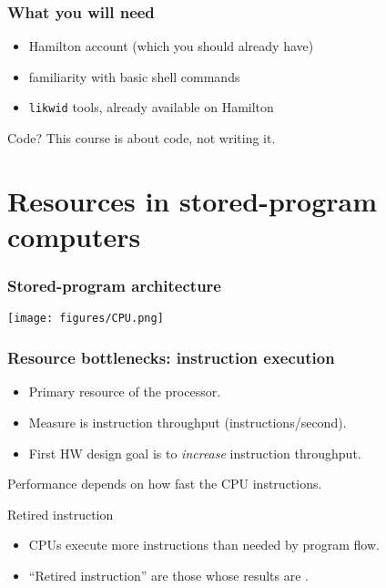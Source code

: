 \documentclass[dvipsnames,presentation,aspectratio=169,14pt]{beamer}
\begin{document}
\begin{frame}
  \frametitle{What you will need}
  \begin{itemize}[itemsep=5pt]
  \item Hamilton account (which you should already have)
  \item familiarity with basic shell commands
  \item \texttt{likwid} tools, already available on Hamilton
  \end{itemize}
  \vskip 15pt
  \begin{challenge}{Code?}
    This course is about  code, not writing it.
  \end{challenge}
\end{frame}

\section{Resources in stored-program computers}

\begin{frame}
  \frametitle{Stored-program architecture}
  \begin{center}
    \texttt{[image: figures/CPU.png]}
  \end{center}
\end{frame}

\begin{frame}
  \frametitle{Resource bottlenecks: instruction execution}
  \begin{itemize}[itemsep=5pt]
  \item Primary resource of the processor.
  \item Measure is instruction throughput (instructions/second).
  \item First HW design goal is to \emph{increase} instruction throughput.
  \end{itemize}
  \centering
  \vskip 5pt
  Performance depends on how fast the CPU  instructions.
  \vskip 5pt
  \pause
  \begin{block}{Retired instruction}
    \begin{itemize}[itemsep=5pt]
    \item CPUs execute more instructions than needed by program flow.
    \item ``Retired instruction'' are those whose results are .
    \end{itemize}
  \end{block}
\end{frame}
\end{document}
